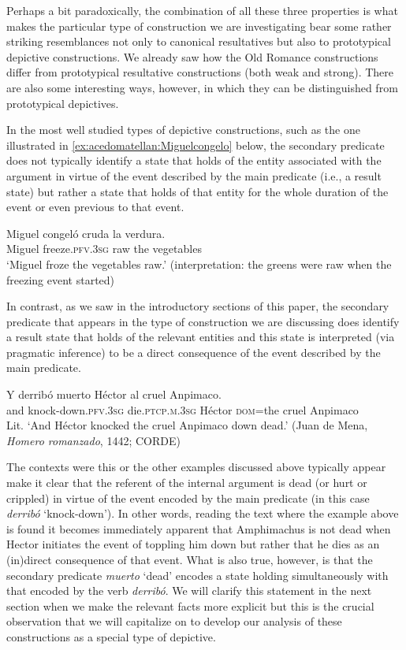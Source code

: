 \documentclass[output=paper,colorlinks,citecolor=brown,
]{langscibook}
\begin{document}
Perhaps a bit paradoxically, the combination of all these three properties is what makes the particular type of construction we are investigating bear some rather striking resemblances not only to canonical resultatives but also to prototypical depictive constructions. We already saw how the Old Romance constructions differ from prototypical resultative constructions (both weak and strong). There are also some interesting ways, however, in which they can be distinguished from prototypical depictives. 

In the most well studied types of depictive constructions, such as the one illustrated in \ref{ex:acedomatellan:Miguelcongelo} below, the secondary predicate does not typically identify a state that holds of the entity associated with the argument in virtue of the event described by the main predicate (i.e., a result state) but rather a state that holds of that entity for the whole duration of the event or even previous to that event. 

\ea \label{ex:acedomatellan:Miguelcongelo}
  \gll Miguel congeló cruda la verdura.\\
Miguel freeze.\textsc{pfv}.\textsc{3sg} raw the vegetables\\
  \glt `Miguel froze the vegetables raw.' (interpretation: the greens were raw when the freezing event started)
\z 

In contrast, as we saw in the introductory sections of this paper, the secondary predicate that appears in the type of construction we are discussing does identify a result state that holds of the relevant entities and this state is interpreted (via pragmatic inference) to be a direct consequence of the event described by the main predicate.

\ea\label{ex:acedomatellan:hector}
  \gll Y derribó muerto Héctor al cruel Anpimaco.\\
and knock-down.\textsc{pfv}.\textsc{3sg}	die.\textsc{ptcp}.\textsc{m}.\textsc{3sg} Héctor \textsc{dom}=the cruel Anpimaco\\
  \glt Lit. `And Héctor knocked the cruel Anpimaco down dead.’ (Juan de Mena, \textit{Homero romanzado}, 1442; CORDE) 
\z 

The contexts were this or the other examples discussed above typically appear make it clear that the referent of the internal argument is dead (or hurt or crippled) in virtue of the event encoded by the main predicate (in this case \textit{derribó} `knock-down'). In other words, reading the text where the example above is found it becomes immediately apparent that Amphimachus is not dead when Hector initiates the event of toppling him down but rather that he dies as an (in)direct consequence of that event. What is also true, however, is that the secondary predicate \textit{muerto} ‘dead’ encodes a state holding simultaneously with that encoded by the verb \textit{derribó}. We will clarify this statement in the next section when we make the relevant facts more explicit but this is the crucial observation that we will capitalize on to develop our analysis of these constructions as a special type of depictive.
\end{document}
